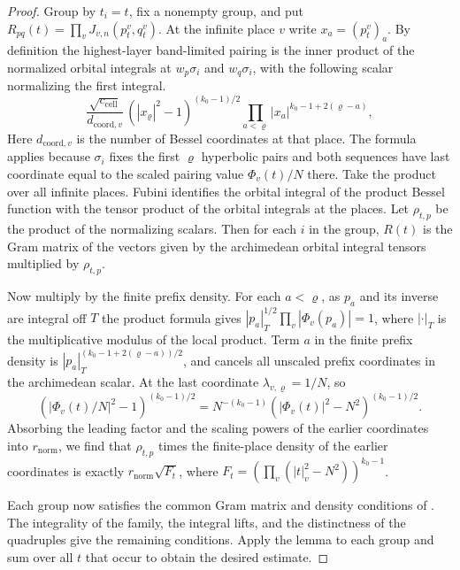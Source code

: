\begin{proof}
Group by $t_i=t$, fix a nonempty group, and put
$R_{pq}(t)=\prod_v J_{v,n}(p^v_t,q^v_t)$.
At the infinite place $v$ write $x_a=(p^v_t)_a$.
By definition the highest-layer band-limited pairing is the inner product of the normalized orbital integrals at $w_p\sigma_i$ and
$w_q\sigma_i$,
with the following scalar normalizing the first integral.
\[
  \frac{\sqrt{c_{\mathrm{cell}}}}{d_{\mathrm{coord},v}}\,
  (|x_\varrho|^2-1)^{(k_0-1)/2}
  \prod_{a<\varrho}|x_a|^{k_0-1+2(\varrho-a)},
\]
Here $d_{\mathrm{coord},v}$ is the number of Bessel coordinates at that place.
The formula applies because $\sigma_i$ fixes the first $\varrho$ hyperbolic pairs and both sequences have last coordinate
equal to the scaled pairing value $\Phi_v(t)/N$ there.
Take the product over all infinite places. Fubini identifies the orbital integral of the product Bessel function with the tensor product of the
orbital integrals at the places. Let $\rho_{t,p}$ be the product of the normalizing scalars.
Then for each $i$ in the group, $R(t)$ is the Gram matrix of the vectors
given by the archimedean orbital integral tensors multiplied by $\rho_{t,p}$.

Now multiply by the finite prefix density. For each $a<\varrho$,
as $p_a$ and its inverse are integral off $T$ the product formula gives
$|p_a|_T^{1/2}\prod_v|\Phi_v(p_a)|=1$,
where $|\cdot|_T$ is the multiplicative modulus of the local product.
Term $a$ in the finite prefix density is
$|p_a|_T^{(k_0-1+2(\varrho-a))/2}$,
and cancels all unscaled prefix coordinates in the archimedean scalar.
At the last coordinate $\lambda_{v,\varrho}=1/N$, so
\[
 (|\Phi_v(t)/N|^2-1)^{(k_0-1)/2}
 =N^{-(k_0-1)}(|\Phi_v(t)|^2-N^2)^{(k_0-1)/2}.
\]
Absorbing the leading factor and the scaling powers of the earlier coordinates into $r_{\mathrm{norm}}$,
we find that $\rho_{t,p}$ times the finite-place density of the earlier coordinates is exactly $r_{\mathrm{norm}}\sqrt{F_t}$,
where $F_t=(\prod_v(|t|_v^2-N^2))^{k_0-1}$.

Each group now satisfies the common Gram matrix and density conditions of .
The integrality of the family, the integral lifts, and the distinctness of the quadruples give the remaining conditions.
Apply the lemma to each group and sum over all $t$ that occur to obtain the desired estimate.
\end{proof}

